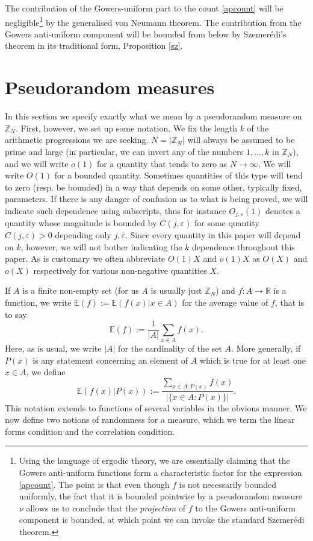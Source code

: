 \documentclass[12pt,a4paper,reqno]{amsart}
\numberwithin{equation}{section}
\theoremstyle{plain}
\theoremstyle{definition}
\def\Z{{\mathbb Z}}
\def\E{{\mathbb E}}
\def\R{{\mathbb R}}
\def\eps{{\varepsilon}}
\def\vs{\vspace{11pt}}
\def\ni{\noindent}
\def\emph#1{{\it #1}}
\begin{document}
\ni The contribution of the Gowers-uniform part to the count \eqref{apcount} will be negligible\footnote{Using the language of ergodic theory, we are essentially claiming that the Gowers anti-uniform functions form a characteristic factor for the expression \eqref{apcount}.  The point is that even though $f$ is not necessarily bounded uniformly, the fact that it is bounded pointwise by a pseudorandom measure $\nu$ allows us to conclude that the \emph{projection} of $f$ to the Gowers anti-uniform component is bounded, at which point we can invoke the standard Szemer\'edi theorem.} by the generalised von Neumann theorem. The contribution from the Gowers anti-uniform component will be bounded from below by Szemer\'edi's theorem in its traditional form, Proposition \ref{sz}. 

\section{Pseudorandom measures}\label{sec3}

\ni In this section we specify exactly what we mean by a pseudorandom measure on $\mathbb{Z}_N$. First, however, we set up some notation. We fix the length $k$ of the arithmetic progressions we are seeking.  $N = |\mathbb{Z}_N|$ will always be assumed to be prime and large (in particular, we can invert any of the numbers $1,\ldots, k$ in $\Z_N$), and we will write $o(1)$ for a quantity that tends to zero as $N \rightarrow \infty$. We will write $O(1)$ for a bounded quantity. Sometimes quantities of this type will tend to zero (resp. be bounded) in a way that depends on some other, typically fixed, parameters. If there is any danger of confusion as to what is being proved, we will indicate such dependence using subscripts, thus for instance $O_{j,\eps}(1)$ denotes a quantity whose magnitude is bounded by $C(j,\eps)$ for some quantity $C(j,\eps) > 0$ depending only $j,\eps$.  Since every quantity in this paper will depend on $k$, however, we will not bother indicating the $k$ dependence throughout this paper.  As is customary
we often abbreviate $O(1) X$ and $o(1) X$ as $O(X)$ and $o(X)$ respectively for various non-negative quantities $X$.\vs

\ni If $A$ is a finite non-empty set (for us $A$ is usually just $\mathbb{Z}_N$) and $f: A \to \R$ is a function,
we write $\E( f ) := \E( f(x) | x \in A )$ for the average value of $f$, that is to say
\[ \E(f) := \frac{1}{|A|} \sum_{x \in A} f(x).\] Here, as is usual, we write $|A|$ for the cardinality of the set $A$. More generally, if $P(x)$ is any statement concerning an element of $A$ which is true for at least one $x \in A$,
we define
\[ \E(f(x) | P(x)) := \frac{ \sum_{x \in A: P(x)} f(x)}{|\{ x \in A: P(x) \}|}.\]
This notation extends to functions of several variables in the obvious manner.  We now define two notions of randomness
for a measure, which we term the linear forms condition and the correlation condition.
\end{document}
